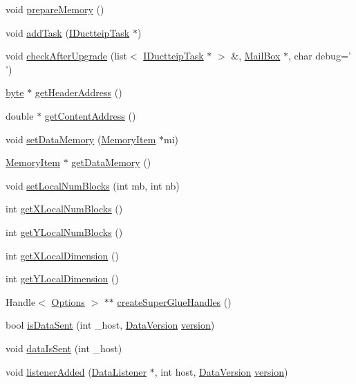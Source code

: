 \begin{DoxyCompactItemize}
\item 
void \hyperlink{class_i_data_a6249481688df51d60d6e6dbf68fb69f2}{prepareMemory} ()
\item 
void \hyperlink{class_i_data_a305f24b50e8e46c4cc3722954e2be4c6}{addTask} (\hyperlink{class_i_ductteip_task}{IDuctteipTask} $\ast$)
\item 
void \hyperlink{class_i_data_a24f0723eb905accf62461f50a4487b33}{checkAfterUpgrade} (list$<$ \hyperlink{class_i_ductteip_task}{IDuctteipTask} $\ast$ $>$ \&, \hyperlink{class_mail_box}{MailBox} $\ast$, char debug=' ')
\item 
\hyperlink{engine_8hpp_a0c8186d9b9b7880309c27230bbb5e69d}{byte} $\ast$ \hyperlink{class_i_data_aa47c48488508421dfab3f8b2c226401e}{getHeaderAddress} ()
\item 
double $\ast$ \hyperlink{class_i_data_a513a1ad05e427af81ca7c34291826efb}{getContentAddress} ()
\item 
void \hyperlink{class_i_data_a6a6c0f1bebc3a8c52cdd858e29a965f6}{setDataMemory} (\hyperlink{struct_memory_item}{MemoryItem} $\ast$mi)
\item 
\hyperlink{struct_memory_item}{MemoryItem} $\ast$ \hyperlink{class_i_data_a1fa868533294d82de9491e5ee179dc2e}{getDataMemory} ()
\item 
void \hyperlink{class_i_data_a80cee3fcea65aff356ddceeece06dc9f}{setLocalNumBlocks} (int mb, int nb)
\item 
int \hyperlink{class_i_data_abec8adf5974fa4f9cd543a165a0e2775}{getXLocalNumBlocks} ()
\item 
int \hyperlink{class_i_data_ada0ea19f911989ef0fc3f75f2337867d}{getYLocalNumBlocks} ()
\item 
int \hyperlink{class_i_data_ab19625c3bf4ba2a2b1b5c3a6ab4ef3ce}{getXLocalDimension} ()
\item 
int \hyperlink{class_i_data_a50f82afec95e867e638b2f3f23dd68ed}{getYLocalDimension} ()
\item 
Handle$<$ \hyperlink{struct_options}{Options} $>$ $\ast$$\ast$ \hyperlink{class_i_data_afbc48e6b22a12e8bcd7694c5613bf866}{createSuperGlueHandles} ()
\item 
bool \hyperlink{class_i_data_a37f03e8f2b04b4f54c6b5768f52c0845}{isDataSent} (int \_\-host, \hyperlink{struct_data_version}{DataVersion} \hyperlink{context_8hpp_aad880fc4455c253781e8968f2239d56f}{version})
\item 
void \hyperlink{class_i_data_ac1422d1f14938dc89f4fabd7fdc90e9a}{dataIsSent} (int \_\-host)
\item 
void \hyperlink{class_i_data_aee488e868fa96b016a0f546fc485f6d7}{listenerAdded} (\hyperlink{class_i_listener}{DataListener} $\ast$, int host, \hyperlink{struct_data_version}{DataVersion} \hyperlink{context_8hpp_aad880fc4455c253781e8968f2239d56f}{version})
$$
\end{DoxyCompactItemize}
